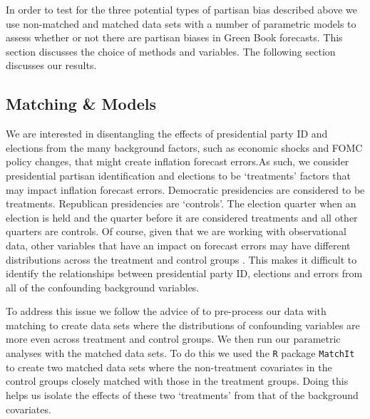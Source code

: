 \documentclass[a4paper]{article}\usepackage{graphicx, color}
\begin{document}
In order to test for the three potential types of partisan bias described above we use non-matched and matched data sets with a number of parametric models \citep[see][]{Ho2007} to assess whether or not there are partisan biases in Green Book forecasts. This section discusses the choice of methods and variables. The following section discusses our results.

\subsection{Matching \& Models}

We are interested in disentangling the effects of presidential party ID and elections from the many background factors, such as economic shocks and FOMC policy changes, that might create inflation forecast errors.As such, we consider presidential partisan identification and elections to be `treatments' factors that may impact inflation forecast errors. Democratic presidencies are considered to be treatments. Republican presidencies are `controls'. The election quarter when an election is held and the quarter before it are considered treatments and all other quarters are controls. Of course, given that we are working with observational data, other variables that have an impact on forecast errors may have different distributions across the treatment and control groups \citep{Diamond2012, Cochran1973}. This makes it difficult to identify the relationships between presidential party ID, elections and errors from all of the confounding background variables.

To address this issue we follow the advice of \cite{Ho2007} to pre-process our data with matching to create data sets where the distributions of confounding variables are more even across treatment and control groups. We then run our parametric analyses with the matched data sets. To do this we used the {\tt{R}} package {\tt{MatchIt}} \citep{matchit2011} to create two matched data sets where the non-treatment covariates in the control groups closely matched with those in the treatment groups. Doing this helps us isolate the effects of these two `treatments' from that of the background covariates. 
\end{document}
